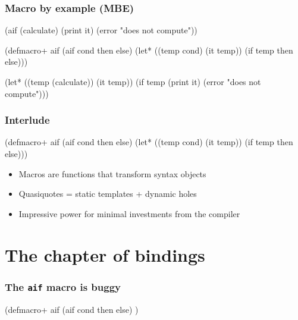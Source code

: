 \documentclass[hyperref={bookmarks=false}]{beamer}
\begin{document}
\begin{frame}[fragile]
\frametitle{Macro by example (MBE)}
\begin{semiverbatim}
(aif (calculate)
  (print it)
  (error "does not compute"))

(defmacro+ aif
  \alert{(aif cond then else)}
  (let* ((temp \alert{cond})
         (it temp))
    (if temp
        \alert{then}
        \alert{else})))

(let* ((temp (calculate))
       (it temp))
  (if temp
    (print it)
    (error "does not compute")))
\end{semiverbatim}
\end{frame}

\begin{frame}[fragile]
\frametitle{Interlude}

\begin{semiverbatim}
(defmacro+ aif
  (aif cond then else)
  (let* ((temp cond)
         (it temp))
    (if temp then else)))
\end{semiverbatim}

\vskip50pt

\begin{itemize}
\item Macros are functions that transform syntax objects
\item Quasiquotes = static templates + dynamic holes
\item Impressive power for minimal investments from the compiler
\end{itemize}
\end{frame}

\section{The chapter of bindings}

\begin{frame}[fragile]
\frametitle{The \texttt{aif} macro is buggy}
\begin{semiverbatim}
\text{\color{blue}{(aif (calculate)}}
  \text{\color{blue}{(print it)}}
  \text{\color{blue}{(error "does not compute"))}}

(defmacro+ aif
  (aif cond then else)
  \text{\color{red}{(let* ((temp cond)}}
         \text{\color{red}{(it temp))}}
    \text{\color{red}{(if temp then else))}})

       \text{\color{red}{(it temp))}}
  \text{\color{red}{(if temp}}
    \text{\color{blue}{(print it)}}
    \text{\color{blue}{(error "does not compute")}}\text{\color{red}{))}}
\end{semiverbatim}
\end{frame}
\end{document}
